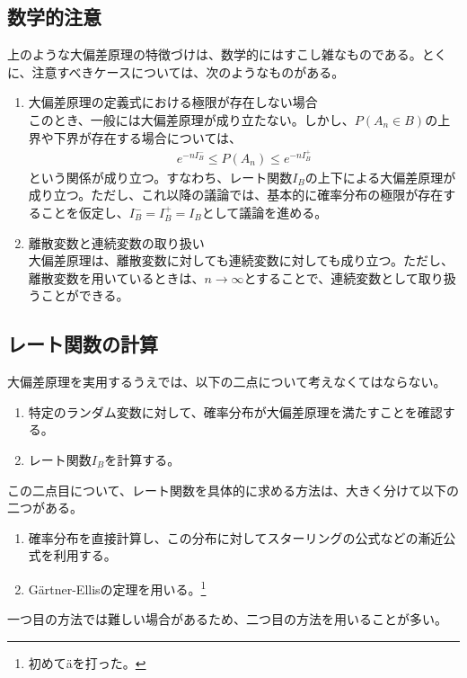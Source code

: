 \documentclass[a4paper,11pt]{jsarticle}
\numberwithin{equation}{section}
\begin{document}
\subsection{数学的注意}
上のような大偏差原理の特徴づけは、数学的にはすこし雑なものである。とくに、注意すべきケースについては、次のようなものがある。
\begin{enumerate}
  \item 大偏差原理の定義式における極限が存在しない場合\\
  このとき、一般には大偏差原理が成り立たない。しかし、$P(A_n\in B) $の上界や下界が存在する場合については、
  \begin{align}
      e^{-nI_B^{-}} \leq P(A_n) \leq e^{-nI_B^{+}}
  \end{align}
  という関係が成り立つ。すなわち、レート関数$I_B$の上下による大偏差原理が成り立つ。ただし、これ以降の議論では、基本的に確率分布の極限が存在することを仮定し、$I_B^{-} = I_B^{+} = I_B$として議論を進める。
  \item 離散変数と連続変数の取り扱い\\
  大偏差原理は、離散変数に対しても連続変数に対しても成り立つ。ただし、離散変数を用いているときは、$n \to \infty$とすることで、連続変数として取り扱うことができる。
\end{enumerate}

\subsection{レート関数の計算}
大偏差原理を実用するうえでは、以下の二点について考えなくてはならない。
\begin{enumerate}
  \item 特定のランダム変数に対して、確率分布が大偏差原理を満たすことを確認する。
  \item レート関数$I_B$を計算する。
\end{enumerate}
この二点目について、レート関数を具体的に求める方法は、大きく分けて以下の二つがある。
\begin{enumerate}
  \item 確率分布を直接計算し、この分布に対してスターリングの公式などの漸近公式を利用する。
  \item G\"{a}rtner-Ellisの定理を用いる。\footnote{初めて\"{a}を打った。} 
\end{enumerate}
一つ目の方法では難しい場合があるため、二つ目の方法を用いることが多い。
\end{document}
